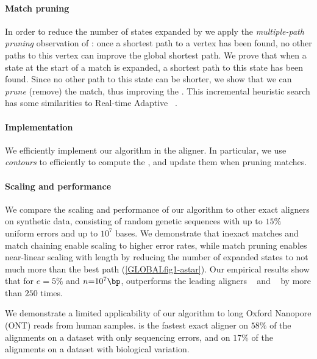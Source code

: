 \paragraph{Match pruning}
In order to reduce the number of states expanded by \A we apply the
\emph{multiple-path pruning} observation of \citet{poole2017artificial}: once a
shortest path to a vertex has been found, no other paths to this vertex can
improve the global shortest path. We prove that when a state at the start of a
match is expanded, a shortest path to this state has been found. Since no other
path to this state can be shorter, we show that we can \emph{prune} (remove) the
match, thus improving the \sh. This incremental heuristic search has some
similarities to Real-time Adaptive \A~\citep{koenig2006real}.

\paragraph{Implementation}
We efficiently implement our algorithm in the \astarpa aligner. In particular,
we use \emph{contours}
\citep{hirschberg1977algorithms,hunt1977fast,pavetic2017fast} to efficiently to
compute the \csh, and update them when pruning matches.

\paragraph{Scaling and performance}
We compare the scaling and performance of our algorithm to other exact aligners
on synthetic data, consisting of random genetic sequences with up to $15\%$
uniform errors and up to $10^7$ bases. We demonstrate that inexact matches and
match chaining enable scaling to higher error rates, while match pruning enables
near-linear scaling with length by reducing the number of expanded states to not
much more than the best path (\cref{GLOBALfig1-astar}). Our empirical results
show that for $e{=}5\%$ and $n{=}10^7\bp$, \astarpa outperforms the leading
aligners \edlib~\citep{vsovsic2017edlib} and \wfa~\citep{marco2022optimal} by
more than $250$ times.

We demonstrate a limited applicability of our algorithm to long Oxford
Nanopore (ONT) reads from human samples. \astarpa is the fastest exact aligner
on $58\%$ of the alignments on a dataset with only sequencing
errors, and on $17\%$ of the alignments on a dataset with biological
variation.


